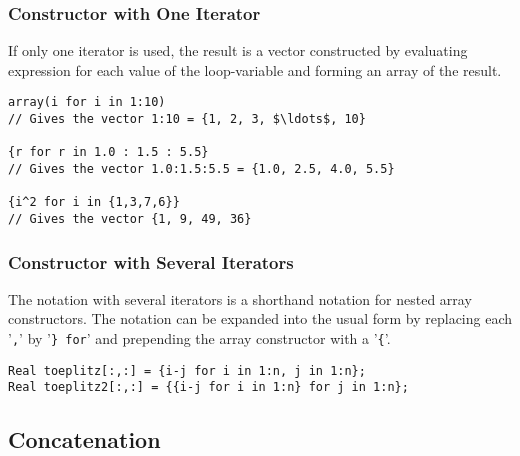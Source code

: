 \subsubsection{Constructor with One Iterator}\label{array-constructor-with-one-iterator}\label{constructor-with-one-iterator}

If only one iterator is used, the result is a vector constructed by
evaluating expression for each value of the loop-variable and forming an
array of the result.

\begin{example}
\begin{lstlisting}[language=modelica]
array(i for i in 1:10)
// Gives the vector 1:10 = {1, 2, 3, $\ldots$, 10}

{r for r in 1.0 : 1.5 : 5.5}
// Gives the vector 1.0:1.5:5.5 = {1.0, 2.5, 4.0, 5.5}

{i^2 for i in {1,3,7,6}}
// Gives the vector {1, 9, 49, 36}
\end{lstlisting}
\end{example}

\subsubsection{Constructor with Several Iterators}\label{array-constructor-with-several-iterators}\label{constructor-with-several-iterators}

The notation with several iterators is a shorthand notation for nested
array constructors. The notation can be expanded into the usual form by
replacing each '\lstinline!,!' by '\lstinline!} for!' and prepending the array constructor with
a '\lstinline!{!'.

\begin{example}
\begin{lstlisting}[language=modelica]
Real toeplitz[:,:] = {i-j for i in 1:n, j in 1:n};
Real toeplitz2[:,:] = {{i-j for i in 1:n} for j in 1:n};
\end{lstlisting}
\end{example}

\subsection{Concatenation}\label{array-concatenation}\label{concatenation}

